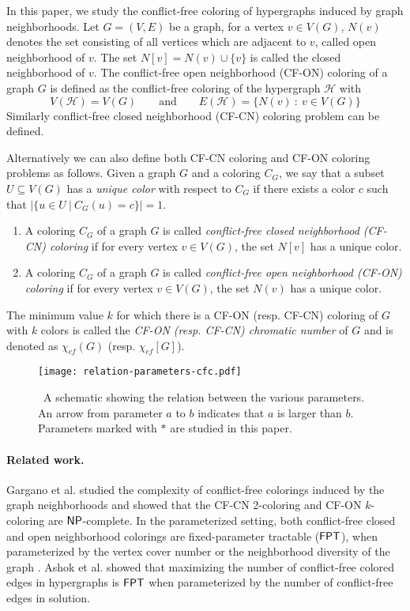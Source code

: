 \documentclass[svgnames]{llncs}
\newcommand{\NP}{\ensuremath{\sf{NP}}\xspace}
\newcommand{\fpt}{\ensuremath{\sf{FPT}}\xspace}
\newcommand{\cfcn}{\textsc {CF-CN}}
\newcommand{\cfon}{\textsc {CF-ON}}
\begin{document}
In this paper, we study the 
conflict-free coloring of hypergraphs induced by graph neighborhoods.
Let $G=(V,E)$ be a graph, for a vertex $v \in V(G)$, $N(v)$ denotes the set consisting of all vertices which are adjacent to $v$, called open neighborhood of $v$. The set $N[v]=N(v) \cup \{v\}$ is called the closed neighborhood of $v$.
The conflict-free open neighborhood (\cfon{}) coloring of a graph $G$ is defined as the conflict-free coloring of the hypergraph $\mathcal{H}$ with 
$$ V(\mathcal{H}) =V(G) \qquad \textrm{and} \qquad E(\mathcal{H})=\{N(v)~:~ v \in V(G)\}$$
Similarly conflict-free closed neighborhood (\cfcn{}) coloring  problem can be defined. 

Alternatively we can also define both \cfcn{} coloring and \cfon{} coloring problems as follows.
Given a graph $G$ and a coloring $C_G$, we say that a subset $U \subseteq V(G)$ has a \emph {unique color} with respect to $C_G$ if there exists a color
$c$ such that $|\{u \in U ~|~ C_G(u)=c\}|=1$.


\begin{definition} 
\begin{enumerate}
 \item  A coloring $C_G$ of a graph $G$ is called \emph{conflict-free closed neighborhood (\cfcn{}) coloring}  if for every vertex $v \in V(G)$, the set $N[v]$ has a unique color.  
 \item  A coloring $C_G$ of a graph $G$ is called \emph{conflict-free open neighborhood (\cfon{}) coloring}  if for every vertex $v\in V(G)$, the set $N(v)$ has a unique color.  
\end{enumerate}
 \end{definition}
The minimum value $k$ for which there is a \cfon{} (resp. \cfcn{}) coloring of $G$
with $k$ colors is called the \emph{\cfon{} (resp. \cfcn{}) chromatic number} of $G$ and is denoted as $\chi_{cf}(G)$ (resp.  $\chi_{cf}[G]$).


\vspace{-0.1cm}
\begin{figure}
\centering
 \texttt{[image: relation-parameters-cfc.pdf]}
 \caption{~A schematic showing the relation between the various parameters. An arrow from parameter $a$ to $b$ indicates that $a$ is larger than $b$. Parameters marked with $*$ are studied in this paper.}
\label{fig-parameters}
\end{figure}
\paragraph{ Related work.} Gargano et al.\cite{gargano2015complexity} studied the complexity of conflict-free colorings induced by the graph neighborhoods and showed that
the \cfcn{} 2-coloring and \cfon{} $k$-coloring are $\NP$-complete.
In the parameterized setting, both conflict-free closed and open neighborhood colorings are fixed-parameter tractable ($\fpt$), when parameterized by the vertex cover number or the neighborhood diversity of the graph \cite{gargano2015complexity}.
Ashok et al. \cite{ashok2015exact} showed that maximizing the number of conflict-free colored edges in hypergraphs is $\fpt$ when parameterized by the number of conflict-free edges in  solution.
\end{document}
